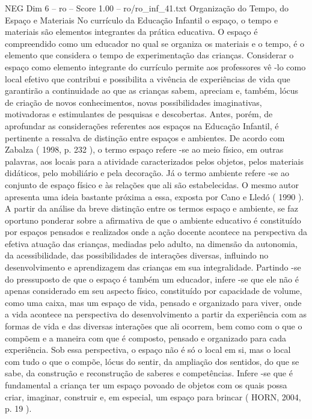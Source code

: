\begin{textsample}{NEG Dim 6 – ro – Score 1.00 – ro/ro\_inf\_41.txt}  \label{ex:f6_neg_152}
Organização do Tempo, do Espaço e Materiais No currículo da Educação Infantil o espaço, o tempo e materiais são elementos integrantes da prática educativa.
O espaço é compreendido como um educador no qual se organiza os materiais e o tempo, é o elemento que considera o tempo de experimentação das crianças.
Considerar o espaço como elemento integrante do currículo permite aos professores vê -lo como local efetivo que contribui e possibilita a vivência de experiências de vida que garantirão a continuidade ao que as crianças sabem, apreciam e, também, lócus de criação de novos conhecimentos, novas possibilidades imaginativas, motivadoras e estimulantes de pesquisas e descobertas.
Antes, porém, de aprofundar as considerações referentes aos espaços na Educação Infantil, é pertinente a ressalva de distinção entre espaços e ambientes.
De acordo com Zabalza ( 1998, p. 232 ), o termo espaço refere -se ao meio físico, em outras palavras, aos locais para a atividade caracterizados pelos objetos, pelos materiais didáticos, pelo mobiliário e pela decoração.
Já o termo ambiente refere -se ao conjunto de espaço físico e às relações que ali são estabelecidas.
O mesmo autor apresenta uma ideia bastante próxima a essa, exposta por Cano e Lledó ( 1990 ).
A partir da análise da breve distinção entre os termos espaço e ambiente, se faz oportuno ponderar sobre a afirmativa de que o ambiente educativo é constituído por espaços pensados e realizados onde a ação docente acontece na perspectiva da efetiva atuação das crianças, mediadas pelo adulto, na dimensão da autonomia, da acessibilidade, das possibilidades de interações diversas, influindo no desenvolvimento e aprendizagem das crianças em sua integralidade.
Partindo -se do pressuposto de que o espaço é também um educador, infere -se que ele não é apenas considerado em seu aspecto físico, constituído por capacidade de volume, como uma caixa, mas um espaço de vida, pensado e organizado para viver, onde a vida acontece na perspectiva do desenvolvimento a partir da experiência com as formas de vida e das diversas interações que ali ocorrem, bem como com o que o compõem e a maneira com que é composto, pensado e organizado para cada experiência.
Sob essa perspectiva, o espaço não é só o local em si, mas o local com tudo o que o compõe, lócus do sentir, da ampliação dos sentidos, do que se sabe, da construção e reconstrução de saberes e competências.
Infere -se que é fundamental a criança ter um espaço povoado de objetos com os quais possa criar, imaginar, construir e, em especial, um espaço para brincar ( HORN, 2004, p. 19 ).

\end{textsample}
